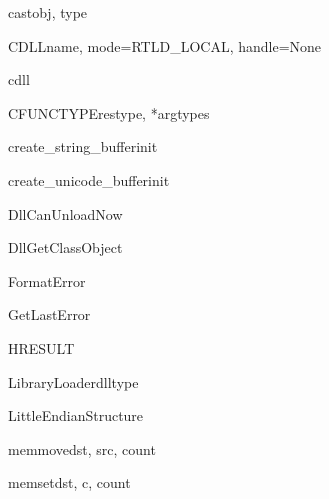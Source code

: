 \begin{funcdesc}{cast}{obj, type}
\end{funcdesc}

\begin{classdesc}{CDLL}{name, mode=RTLD_LOCAL, handle=None}
\end{classdesc}

\begin{datadesc}{cdll}
\end{datadesc}

\begin{funcdesc}{CFUNCTYPE}{restype, *argtypes}
\end{funcdesc}

\begin{funcdesc}{create_string_buffer}{init}
\end{funcdesc}

\begin{funcdesc}{create_unicode_buffer}{init}
\end{funcdesc}

\begin{funcdesc}{DllCanUnloadNow}{}
\end{funcdesc}

\begin{funcdesc}{DllGetClassObject}{}
\end{funcdesc}

\begin{funcdesc}{FormatError}{}
\end{funcdesc}

\begin{funcdesc}{GetLastError}{}
\end{funcdesc}

\begin{classdesc}{HRESULT}{}
\end{classdesc}

\begin{classdesc}{LibraryLoader}{dlltype}
\end{classdesc}

\begin{classdesc}{LittleEndianStructure}{}
\end{classdesc}

\begin{funcdesc}{memmove}{dst, src, count}
\end{funcdesc}

\begin{funcdesc}{memset}{dst, c, count}
\end{funcdesc}

